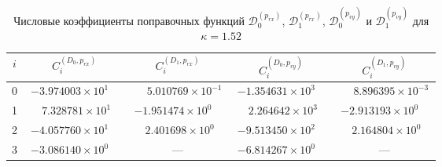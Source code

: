 \begin{table}[htbp]
	\centering
	\caption{Числовые коэффициенты поправочных функций $\mathcal D_0^{(p_{rx})}$, $\mathcal D_1^{(p_{rx})}$, $\mathcal D_0^{(p_{vy})}$ и $\mathcal D_1^{(p_{vy})}$ для $\kappa = 1.52$}
	\label{tab:appendixB_D_pair2_k152}
	\begin{tabular}{|c|c|c|c|c|}
		\hline
		$i$ & $C_i^{(D_0,p_{rx})}$ & $C_i^{(D_1,p_{rx})}$ & $C_i^{(D_0,p_{vy})}$ & $C_i^{(D_1,p_{vy})}$ \\
		\hline
		0 & $-3.974003\times10^{1\phantom{-}}$ & $\phantom{-}5.010769\times10^{-1}$ & $-1.354631\times10^{3\phantom{-}}$ & $\phantom{-}8.896395\times10^{-3}$ \\
		1 & $\phantom{-}7.328781\times10^{1\phantom{-}}$ & $-1.951474\times10^{0\phantom{-}}$ & $\phantom{-}2.264642\times10^{3\phantom{-}}$ & $-2.913193\times10^{0\phantom{-}}$ \\
		2 & $-4.057760\times10^{1\phantom{-}}$ & $\phantom{-}2.401698\times10^{0\phantom{-}}$ & $-9.513450\times10^{2\phantom{-}}$ & $\phantom{-}2.164804\times10^{0\phantom{-}}$ \\
		3 & $-3.086140\times10^{0\phantom{-}}$ & --- & $-6.814267\times10^{0\phantom{-}}$ & --- \\
		\hline
	\end{tabular}
\end{table}
